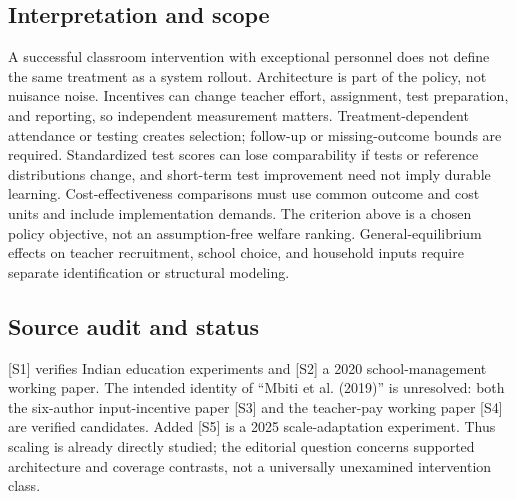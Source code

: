 \documentclass[11pt,a4paper]{article}
\begin{document}
\subsection*{Interpretation and scope}
A successful classroom intervention with exceptional personnel does not define the same treatment as a system rollout. Architecture is part of the policy, not nuisance noise. Incentives can change teacher effort, assignment, test preparation, and reporting, so independent measurement matters. Treatment-dependent attendance or testing creates selection; follow-up or missing-outcome bounds are required. Standardized test scores can lose comparability if tests or reference distributions change, and short-term test improvement need not imply durable learning. Cost-effectiveness comparisons must use common outcome and cost units and include implementation demands. The criterion above is a chosen policy objective, not an assumption-free welfare ranking. General-equilibrium effects on teacher recruitment, school choice, and household inputs require separate identification or structural modeling.
\subsection*{Source audit and status}
[S1] verifies Indian education experiments and [S2] a 2020 school-management working paper. The intended identity of ``Mbiti et al. (2019)'' is unresolved: both the six-author input-incentive paper [S3] and the teacher-pay working paper [S4] are verified candidates. Added [S5] is a 2025 scale-adaptation experiment. Thus scaling is already directly studied; the editorial question concerns supported architecture and coverage contrasts, not a universally unexamined intervention class.
\end{document}

